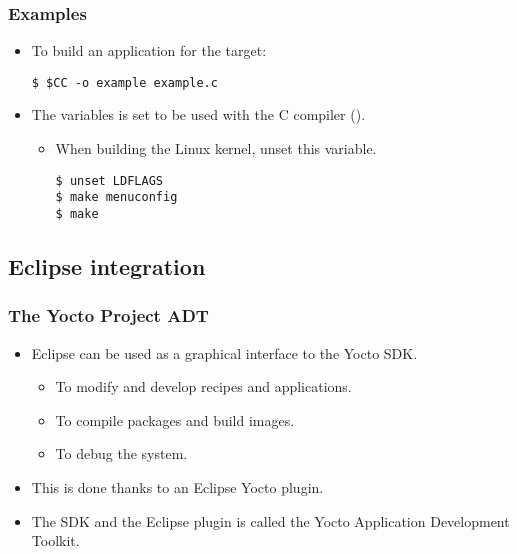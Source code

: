 \begin{frame}[fragile]
  \frametitle{Examples}
  \begin{itemize}
    \item To build an application for the target:
      \begin{block}{}
        \begin{verbatim}
$ $CC -o example example.c
        \end{verbatim}
      \end{block}
    \item The  variables is set to be used with the C
      compiler ().
      \begin{itemize}
        \item When building the Linux kernel, unset this variable.
          \begin{block}{}
            \begin{verbatim}
$ unset LDFLAGS
$ make menuconfig
$ make
            \end{verbatim}
          \end{block}
      \end{itemize}
  \end{itemize}
\end{frame}

\subsection{Eclipse integration}

\begin{frame}
  \frametitle{The Yocto Project ADT}
  \begin{itemize}
    \item Eclipse can be used as a graphical interface to the Yocto
      SDK.
      \begin{itemize}
        \item To modify and develop recipes and applications.
        \item To compile packages and build images.
        \item To debug the system.
      \end{itemize}
    \item This is done thanks to an Eclipse Yocto plugin.
    \item The SDK and the Eclipse plugin is called the Yocto
      Application Development Toolkit.
  \end{itemize}
\end{frame}

